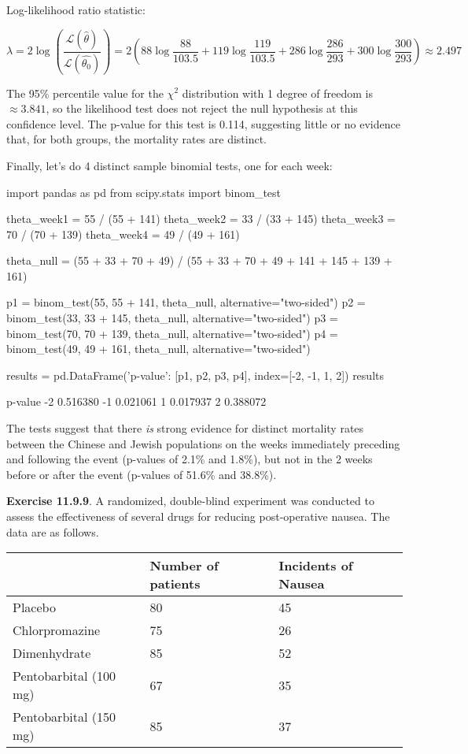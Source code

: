 Log-likelihood ratio statistic:

\[ \lambda = 2 \log \left( \frac{\mathcal{L}(\hat{\theta})}{\mathcal{L}(\hat{\theta_0})} \right)
= 2 \left( 88 \log \frac{88}{103.5} + 119 \log \frac{119}{103.5} + 286 \log \frac{286}{293} + 300 \log \frac{300}{293} \right) \approx 2.497
\]

The 95\% percentile value for the \(\chi^2\) distribution with 1 degree
of freedom is \(\approx 3.841\), so the likelihood test does not reject
the null hypothesis at this confidence level. The p-value for this test
is 0.114, suggesting little or no evidence that, for both groups, the
mortality rates are distinct.

Finally, let's do 4 distinct sample binomial tests, one for each week:

\begin{python}
import pandas as pd
from scipy.stats import binom_test

theta_week1 = 55 / (55 + 141)
theta_week2 = 33 / (33 + 145)
theta_week3 = 70 / (70 + 139)
theta_week4 = 49 / (49 + 161)

theta_null = (55 + 33 + 70 + 49) / (55 + 33 + 70 + 49 + 141 + 145 + 139 + 161)

p1 = binom_test(55, 55 + 141, theta_null, alternative="two-sided")
p2 = binom_test(33, 33 + 145, theta_null, alternative="two-sided")
p3 = binom_test(70, 70 + 139, theta_null, alternative="two-sided")
p4 = binom_test(49, 49 + 161, theta_null, alternative="two-sided")

results = pd.DataFrame({'p-value': [p1, p2, p3, p4]}, index=[-2, -1, 1, 2])
results
\end{python}

\begin{console}
     p-value
-2  0.516380
-1  0.021061
 1  0.017937
 2  0.388072
\end{console}

The tests suggest that there \emph{is} strong evidence for distinct
mortality rates between the Chinese and Jewish populations on the weeks
immediately preceding and following the event (p-values of 2.1\% and
1.8\%), but not in the 2 weeks before or after the event (p-values of
51.6\% and 38.8\%).

\textbf{Exercise 11.9.9}. A randomized, double-blind experiment was
conducted to assess the effectiveness of several drugs for reducing
post-operative nausea. The data are as follows.

\begin{longtable}[]{@{}lll@{}}
\toprule\noalign{}
& Number of patients & Incidents of Nausea \\
\midrule\noalign{}
\endhead
\bottomrule\noalign{}
\endlastfoot
Placebo & 80 & 45 \\
Chlorpromazine & 75 & 26 \\
Dimenhydrate & 85 & 52 \\
Pentobarbital (100 mg) & 67 & 35 \\
Pentobarbital (150 mg) & 85 & 37 \\
\end{longtable}

